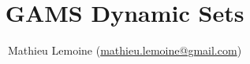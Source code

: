 \documentclass{article}
\newcommand{\mail}[1]{\href{mailto:#1}{#1}}
\begin{document}

\title{GAMS Dynamic Sets}

\author{Mathieu Lemoine (\mail{mathieu.lemoine@gmail.com})}

\maketitle


\end{document}
